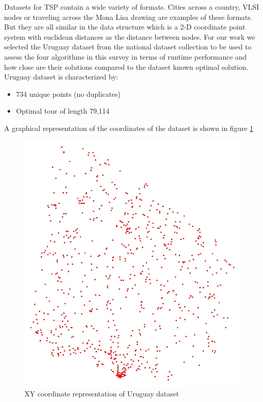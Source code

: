 \documentclass[twocolumn]{article}
\begin{document}
	Datasets for TSP contain a wide variety of formats. Cities across a country, VLSI nodes or traveling across the Mona Lisa drawing are examples of these formats. But they are all similar in the data structure which is a 2-D coordinate point system with euclidean distances as the distance between nodes.
	For our work we selected the Uruguay dataset from the national dataset collection\cite{UY734} to be used to assess the four algorithms in this survey in terms of runtime performance and how close are their solutions compared to the dataset known optimal solution. Uruguay dataset is characterized by: 
	\begin{itemize}
		\item 734 unique points (no duplicates)
		\item Optimal tour of length 79,114
	\end{itemize}
	A graphical representation of the coordinates of the dataset is shown in figure \ref{fig:uruguay}
	\begin{figure}[h!]
		\centering
		\includegraphics[scale=0.3]{./uypoints.jpg}
		\caption{XY coordinate representation of Uruguay dataset}
		\label{fig:uruguay}
	\end{figure}
	
\end{document}
